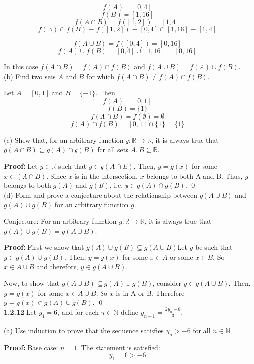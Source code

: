 \documentclass{article}
\begin{document}
$$ f(A) = [0,4]$$
$$ f(B) = [1,16]$$
$$ f(A \cap B) = f([1,2]) = [1,4]$$
$$ f(A) \cap f(B) = f([1,2]) = [0,4] \cap [1, 16] = [1,4]$$

$$ f(A \cup B) = f([0,4]) = [0,16]$$
$$ f(A) \cup f(B) = [0,4] \cup [1,16] = [0,16]$$

In this case $f(A \cap B) = f(A) \cap f(B)$ and $f(A \cup B) = f(A) \cup f(B)$. \\

(b) Find two sets $A$ and $B$ for which $f(A \cap B) \neq f(A) \cap f(B)$.

Let $A = [0,1]$ and $B = \{-1\}$. Then
$$ f(A) = [0,1]$$
$$ f(B) = \{1\} $$
$$ f(A \cap B) = f(\emptyset) = \emptyset$$
$$ f(A) \cap f(B) = [0,1] \cap \{1\} = \{1\}$$ 

(c) Show that, for an arbitrary function $g : \mathbb{R} \rightarrow \mathbb{R}$, it is always true that
$g(A \cap B) \subseteq g(A) \cap g(B)$ for all sets $A, B \subseteq \mathbb{R}$. 

\textbf{Proof:} Let $y \in \mathbb{R}$ such that $y \in g(A \cap B)$. Then, $y = g(x)$ for some $x \in (A \cap B)$. Since $x$ is in the intersection, $x$ belongs to both A and B. Thus, $y$ belongs to both $g(A)$ and $g(B)$, i.e. $y \in g(A) \cap g(B)$. \qed\\

(d) Form and prove a conjecture about the relationship between $g(A \cup B)$ and $g(A) \cup g(B)$ for an arbitrary function $g$.

Conjecture: For an arbitrary function $g: \mathbb{R} \rightarrow \mathbb{R}$, it is always true that $g(A) \cup g(B) = g(A \cup B)$.

\textbf{Proof:} First we show that $g(A) \cup g(B) \subseteq g(A \cup B)$Let $y$ be such that $y \in g(A) \cup g(B)$. Then, $y = g(x)$ for some $x \in A$ or some $x \in B$. So $x \in A \cup B$ and therefore, $y \in g(A \cup B)$.

Now, to show that $g(A \cup B) \subseteq g(A) \cup g(B)$, consider $y \in g(A \cup B)$. Then, $y = g(x)$ for some $x \in A \cup B$. So $x$ is in A or B. Therefore $y = g(x) \in g(A) \cup g(B)$. \qed \\



\noindent \textbf{1.2.12}
Let $y_1 = 6$, and for each $n \in \mathbb{N}$ define $y_{n+1} = \frac{2y_n - 6}{3}$.

(a) Use induction to prove that the sequence satisfies $y_n > -6$ for all $n \in \mathbb{N}$.

\textbf{Proof:} Base case: $n=1$. The statement is satisfied:
$$ y_1 = 6 > -6$$
\end{document}
